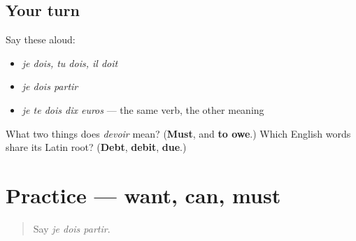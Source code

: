 \subsection*{Your turn}
Say these aloud:

\begin{itemize}
\raggedright
  \item \emph{je dois, tu dois, il doit}
  \item \emph{je dois partir}
  \item \emph{je te dois dix euros} — the same verb, the other meaning
\end{itemize}

\begin{tcolorbox}[breakable,colback=teal!4,colframe=teal!35!black,title={Before you move on}]
What two things does \emph{devoir} mean? (\textbf{Must}, and \textbf{to owe}.) Which English words share its Latin root? (\textbf{Debt}, \textbf{debit}, \textbf{due}.)
\end{tcolorbox}
\section[Practice]{Practice — want, can, must}

\label{lesson:FR-C33-practice}



\begin{quote}
Say \emph{je dois partir}.
\end{quote}

